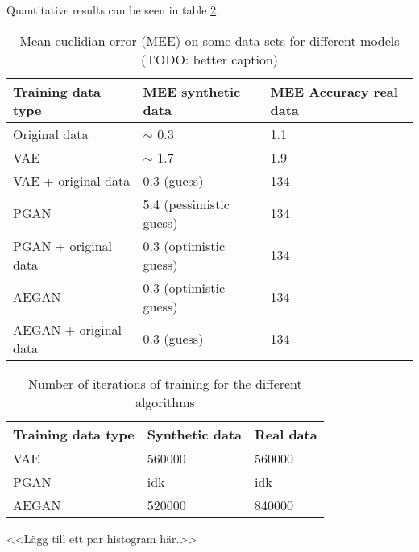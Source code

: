 Quantitative results can be seen in table \ref{tab:quantitative_results}.

\begin{table}[t]
    \centering
    \caption{Mean euclidian error (MEE) on some data sets for different models (TODO: better caption) }
    \label{tab:quantitative_results}
    \begin{tabular}{l|l|l}
    \hline
    Training data type      & MEE synthetic data  & MEE Accuracy real data \\ \hline
    Original data           & $\sim$ 0.3 & 1.1     \\
    VAE                     & $\sim$ 1.7 & 1.9     \\
    VAE + original data     & 0.3 (guess) & 134     \\
    PGAN                    & 5.4 (pessimistic guess) & 134     \\
    PGAN + original data    & 0.3 (optimistic guess) & 134     \\
    AEGAN                   & 0.3 (optimistic guess) & 134     \\
    AEGAN + original data   & 0.3 (guess) & 134     \\
    \end{tabular}
\end{table}

\begin{table}[t]
    \centering
    \caption{Number of iterations of training for the different algorithms}
    \label{tab:quantitative_results}
    \begin{tabular}{l|l|l}
    \hline
    Training data type      & Synthetic data  & Real data \\ \hline
    VAE                     & 560000 & 560000 \\
    PGAN                    & idk & idk     \\
    AEGAN                   & 520000 & 840000   \\
    \end{tabular}
\end{table}

<<Lägg till ett par histogram här.>>
